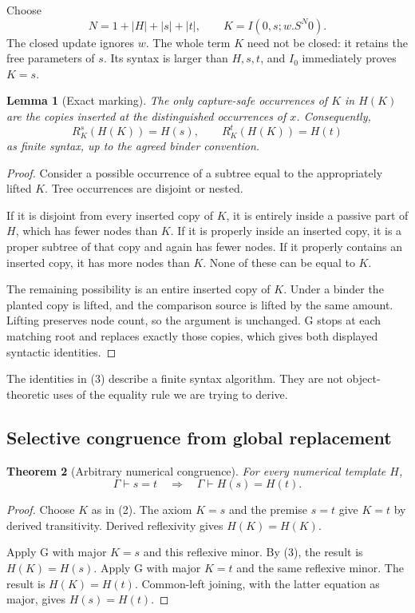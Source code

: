 \documentclass[11pt,letterpaper]{article}
\newtheorem{theorem}{Theorem}[section]
\newtheorem{lemma}[theorem]{Lemma}
\theoremstyle{definition}
\theoremstyle{remark}
\newcommand{\Rep}[3]{R_{#1}^{#2}(#3)}
\begin{document}
Choose
\[
 N=1+|H|+|s|+|t|,\qquad
 K=I(0,s;w.S^N0).
 \tag{2}\label{new:marker}
\]
The closed update ignores $w$. The whole term $K$ need not be closed:
it retains the free parameters of $s$. Its syntax is larger than $H,s,t$,
and $I_0$ immediately proves $K=s$.

\begin{lemma}[Exact marking]\label{new:markerlemma}
The only capture-safe occurrences of $K$ in $H(K)$ are the copies
inserted at the distinguished occurrences of $x$. Consequently,
\[
 \Rep{K}{s}{H(K)}=H(s),\qquad
 \Rep{K}{t}{H(K)}=H(t)
 \tag{3}\label{new:markeridentities}
\]
as finite syntax, up to the agreed binder convention.
\end{lemma}
\begin{proof}
Consider a possible occurrence of a subtree equal to the appropriately
lifted $K$. Tree occurrences are disjoint or nested.

If it is disjoint from every inserted copy of $K$, it is entirely inside
a passive part of $H$, which has fewer nodes than $K$.
If it is properly inside an inserted copy, it is a proper subtree of
that copy and again has fewer nodes.
If it properly contains an inserted copy, it has more nodes than $K$.
None of these can be equal to $K$.

The remaining possibility is an entire inserted copy of $K$. Under a
binder the planted copy is lifted, and the comparison source is lifted
by the same amount. Lifting preserves node count, so the argument is
unchanged. G stops at each matching root and replaces exactly those
copies, which gives both displayed syntactic identities.
\end{proof}

The identities in (3) describe a finite syntax algorithm. They are not
object-theoretic uses of the equality rule we are trying to derive.

\subsection{Selective congruence from global replacement}

\begin{theorem}[Arbitrary numerical congruence]\label{new:congruence}
For every numerical template $H$,
\[
           \Gamma\vdash s=t
           \quad\Longrightarrow\quad
           \Gamma\vdash H(s)=H(t).
\]
\end{theorem}
\begin{proof}
Choose $K$ as in (2). The axiom $K=s$ and the premise $s=t$ give $K=t$
by derived transitivity. Derived reflexivity gives $H(K)=H(K)$.

Apply G with major $K=s$ and this reflexive minor. By (3), the result is
$H(K)=H(s)$. Apply G with major $K=t$ and the same reflexive minor.
The result is $H(K)=H(t)$. Common-left joining, with the latter equation
as major, gives $H(s)=H(t)$.
\end{proof}
\end{document}
